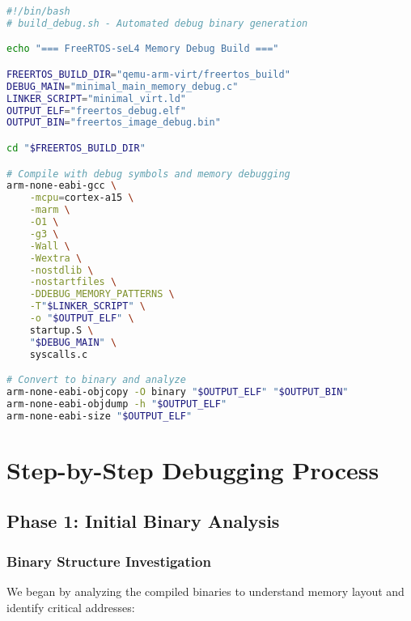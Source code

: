 \documentclass[11pt,a4paper]{article}
\begin{document}
\begin{lstlisting}[language=bash,caption={Debug Build Automation Script}]
#!/bin/bash
# build_debug.sh - Automated debug binary generation

echo "=== FreeRTOS-seL4 Memory Debug Build ==="

FREERTOS_BUILD_DIR="qemu-arm-virt/freertos_build"
DEBUG_MAIN="minimal_main_memory_debug.c"
LINKER_SCRIPT="minimal_virt.ld"
OUTPUT_ELF="freertos_debug.elf"
OUTPUT_BIN="freertos_image_debug.bin"

cd "$FREERTOS_BUILD_DIR"

# Compile with debug symbols and memory debugging
arm-none-eabi-gcc \
    -mcpu=cortex-a15 \
    -marm \
    -O1 \
    -g3 \
    -Wall \
    -Wextra \
    -nostdlib \
    -nostartfiles \
    -DDEBUG_MEMORY_PATTERNS \
    -T"$LINKER_SCRIPT" \
    -o "$OUTPUT_ELF" \
    startup.S \
    "$DEBUG_MAIN" \
    syscalls.c

# Convert to binary and analyze
arm-none-eabi-objcopy -O binary "$OUTPUT_ELF" "$OUTPUT_BIN"
arm-none-eabi-objdump -h "$OUTPUT_ELF"
arm-none-eabi-size "$OUTPUT_ELF"
\end{lstlisting}

\section{Step-by-Step Debugging Process}

\subsection{Phase 1: Initial Binary Analysis}

\subsubsection{Binary Structure Investigation}

We began by analyzing the compiled binaries to understand memory layout and identify critical addresses:
\end{document}
